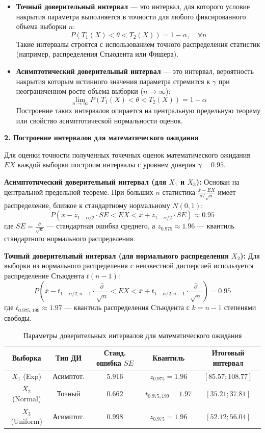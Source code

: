 \documentclass[a4paper,12pt]{article}
\begin{document}
\begin{itemize}
    \item \textbf{Точный доверительный интервал} --- это интервал, для которого условие накрытия параметра выполняется в точности для любого фиксированного объема выборки $n$:
    \[ P(T_1(X) < \theta < T_2(X)) = 1 - \alpha, \quad \forall n \]
    Такие интервалы строятся с использованием точного распределения статистик (например, распределения Стьюдента или Фишера).
    
    \item \textbf{Асимптотический доверительный интервал} --- это интервал, вероятность накрытия которым истинного значения параметра стремится к $\gamma$ при неограниченном росте объема выборки ($n \to \infty$):
    \[ \lim_{n \to \infty} P(T_1(X) < \theta < T_2(X)) = 1 - \alpha \]
    Построение таких интервалов опирается на центральную предельную теорему или свойство асимптотической нормальности оценок.
\end{itemize}

\textbf{2. Построение интервалов для математического ожидания}

Для оценки точности полученных точечных оценок математического ожидания $E X$ каждой выборки построим интервалы с уровнем доверия $\gamma = 0.95$.

\textbf{Асимптотический доверительный интервал (для $X_1$ и $X_3$):}
Основан на центральной предельной теореме. При больших $n$ статистика $\frac{\overline{x} - E X}{\hat{\sigma}/\sqrt{n}}$ имеет распределение, близкое к стандартному нормальному $N(0, 1)$:
\[
P\left(\overline{x} - z_{1-\alpha/2} \cdot SE < E X < \overline{x} + z_{1-\alpha/2} \cdot SE\right) \approx 0.95
\]
где $SE = \frac{\hat{\sigma}}{\sqrt{n}}$ --- стандартная ошибка среднего, а $z_{0.975} \approx 1.96$ --- квантиль стандартного нормального распределения.

\textbf{Точный доверительный интервал (для нормального распределения $X_2$):}
Для выборки из нормального распределения с неизвестной дисперсией используется распределение Стьюдента $t(n-1)$:
\[
P\left(\overline{x} - t_{1-\alpha/2, n-1} \cdot \frac{\hat{\sigma}}{\sqrt{n}} < E X < \overline{x} + t_{1-\alpha/2, n-1} \cdot \frac{\hat{\sigma}}{\sqrt{n}}\right) = 0.95
\]
где $t_{0.975, 199} \approx 1.97$ --- квантиль распределения Стьюдента с $k = n-1$ степенями свободы. 

\begin{table}[H]
\centering
\begin{tabular}{|c|c|c|c|c|}
\hline
Выборка & Тип ДИ & Станд. ошибка $SE$ & Квантиль & Итоговый интервал \\ \hline
$X_1$ (Exp) & Асимптот. & $5.916$ & $z_{0.975} = 1.96$ & $[85.57; 108.77]$ \\ \hline
$X_2$ (Normal) & Точный & $0.662$ & $t_{0.975, 199} = 1.97$ & $[35.21; 37.81]$ \\ \hline
$X_3$ (Uniform) & Асимптот. & $0.998$ & $z_{0.975} = 1.96$ & $[52.12; 56.04]$ \\ \hline
\end{tabular}
\caption{Параметры доверительных интервалов для математического ожидания}
\end{table}
\end{document}
